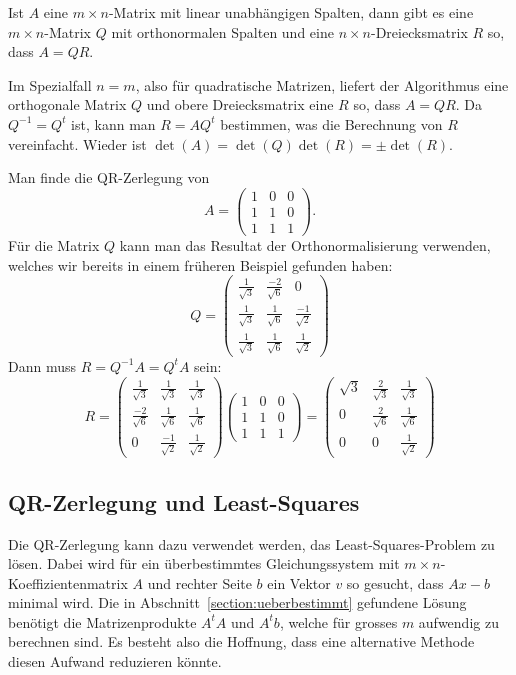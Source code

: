 \begin{satz}[QR-Zerlegung]
Ist $A$ eine $m\times n$-Matrix mit linear unabhängigen Spalten,
dann gibt es eine $m\times n$-Matrix $Q$ mit orthonormalen Spalten
und eine $n\times n$-Dreiecksmatrix $R$ so, dass $A=QR$.
\end{satz}

Im Spezialfall $n=m$, also für quadratische Matrizen, liefert der
Algorithmus eine orthogonale Matrix $Q$ und obere Dreiecksmatrix eine $R$
so, dass $A=QR$.
Da $Q^{-1}=Q^t$ ist, kann man $R=AQ^t$ bestimmen,
was die Berechnung von $R$ vereinfacht.
Wieder ist $\det(A)=\det(Q)\det(R)=\pm\det(R)$.

\begin{beispiel}
Man finde die QR-Zerlegung von 
\[
A=\begin{pmatrix}1&0&0\\1&1&0\\1&1&1\end{pmatrix}.
\]
Für die Matrix $Q$ kann man das Resultat der Orthonormalisierung
verwenden, welches wir bereits in einem früheren Beispiel gefunden
haben:
\[
Q=
\begin{pmatrix}
\frac1{\sqrt{3}}&\frac{-2}{\sqrt{6}}&0\\
\frac1{\sqrt{3}}&\frac{1}{\sqrt{6}}&\frac{-1}{\sqrt{2}}\\
\frac1{\sqrt{3}}&\frac{1}{\sqrt{6}}&\frac{1}{\sqrt{2}}
\end{pmatrix}
\]
Dann muss $R=Q^{-1}A=Q^tA$ sein:
\[
R=
\begin{pmatrix}
\frac1{\sqrt{3}}&\frac1{\sqrt{3}}&\frac1{\sqrt{3}}\\
\frac{-2}{\sqrt{6}}&\frac{1}{\sqrt{6}}&\frac{1}{\sqrt{6}}\\
0&\frac{-1}{\sqrt{2}}&\frac{1}{\sqrt{2}}
\end{pmatrix}
\begin{pmatrix}1&0&0\\1&1&0\\1&1&1\end{pmatrix}
=
\begin{pmatrix}
\sqrt{3}&\frac{2}{\sqrt{3}}&\frac{1}{\sqrt{3}}\\
0&\frac2{\sqrt{6}}&\frac1{\sqrt{6}}\\
0&0&\frac1{\sqrt{2}}
\end{pmatrix}
\]
\end{beispiel}

\subsection{QR-Zerlegung und Least-Squares}
Die QR-Zerlegung kann dazu verwendet werden, das Least-Squares-Problem
zu lösen.
Dabei wird für ein überbestimmtes Gleichungssystem mit
$m\times n$-Koeffizienten\-matrix $A$ und rechter Seite $b$ ein Vektor $v$
so gesucht,
dass $Ax-b$ minimal wird.
Die in Abschnitt~\ref{section:ueberbestimmt}
gefundene Lösung benötigt die Matrizenprodukte $A^tA$ und $A^tb$, welche
für grosses $m$ aufwendig zu berechnen sind.
Es besteht also die Hoffnung,
dass eine alternative Methode diesen Aufwand reduzieren könnte.

